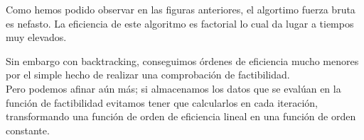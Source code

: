 \documentclass[12pt,spanish]{article}
\begin{document}
Como hemos podido observar en las figuras anteriores, el algortimo fuerza bruta es nefasto. La eficiencia de este algoritmo es factorial lo cual da lugar a tiempos muy elevados.

Sin embargo con backtracking, conseguimos órdenes de eficiencia mucho menores por el simple hecho de realizar una comprobación de factibilidad. \\

Pero podemos afinar aún más; si almacenamos los datos que se evalúan en la función de factibilidad evitamos tener que calcularlos en cada iteración, transformando una función de orden de eficiencia lineal en una función de orden constante.

\end{document}
